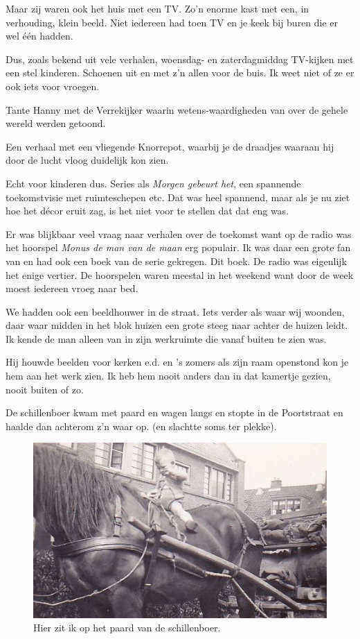 \documentclass[12pt,twoside, openright]{memoir}
\begin{document}
Maar zij waren ook het huis met een TV. Zo’n enorme kast met een, in verhouding, klein beeld. Niet iedereen had toen TV en je keek bij buren die er wel één hadden.

Dus, zoals bekend uit vele verhalen, woensdag- en zaterdagmiddag TV-kijken met een stel kinderen. Schoenen uit en met z'n allen voor de buis. Ik weet niet of ze er ook iets voor vroegen.

Tante Hanny met de Verrekijker waarin wetens-waardigheden van over de gehele wereld werden getoond. 

Een verhaal met een vliegende Knorrepot, waarbij je de draadjes waaraan hij door de lucht vloog duidelijk kon zien. 

Echt voor kinderen dus. Series als \emph{Morgen gebeurt het}, een spannende toekomstvisie met ruimteschepen etc. Dat was heel spannend, maar als je nu ziet hoe het décor eruit zag, is het niet voor te stellen dat dat eng was.

Er was blijkbaar veel vraag naar verhalen over de toekomst want op de radio was het hoorspel \emph{Monus de man van de maan} erg populair. Ik was daar een grote fan van en had ook een boek van de serie gekregen. Dit boek. De radio was eigenlijk het enige vertier. De hoorspelen waren meestal in het weekend want door de week moest iedereen vroeg naar bed.

We hadden ook een beeldhouwer in de straat. Iets verder als waar wij woonden, daar waar midden in het blok huizen een grote steeg naar achter de huizen leidt. Ik kende de man alleen van in zijn werkruimte die vanaf buiten te zien was. 

Hij houwde beelden voor kerken e.d. en 's zomers als zijn raam openstond kon je hem aan het werk zien. Ik heb hem nooit anders dan in dat kamertje gezien, nooit buiten of zo.

De schillenboer kwam met paard en wagen langs en stopte in de Poortstraat en haalde dan achterom z’n waar op. (en slachtte soms ter plekke). 

\begin{figure}
\includegraphics[width=\textwidth]{img/ch5/schillenboer}
\caption*{\footnotesize Hier zit ik op het paard van de schillenboer.}
\end{figure}
\end{document}
